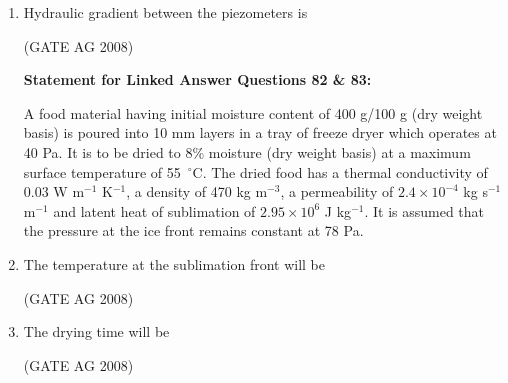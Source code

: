 \documentclass[journal,12pt,onecolumn]{IEEEtran}
\begin{document}
\begin{enumerate}
\medskip

\item 
 Hydraulic gradient between the piezometers is
\begin{enumerate}
\end{enumerate}
\hfill(GATE AG 2008)\\

\medskip

\textbf{Statement for Linked Answer Questions 82 \& 83:}

A food material having initial moisture content of 400 g/100 g (dry weight basis) is poured into 10 mm layers in a tray of freeze dryer which operates at 40 Pa. It is to be dried to 8\% moisture (dry weight basis) at a maximum surface temperature of 55~$^\circ$C. The dried food has a thermal conductivity of 0.03 W m$^{-1}$ K$^{-1}$, a density of 470 kg m$^{-3}$, a permeability of $2.4\times 10^{-4}$ kg s$^{-1}$ m$^{-1}$ and latent heat of sublimation of $2.95 \times 10^6$ J kg$^{-1}$. It is assumed that the pressure at the ice front remains constant at 78 Pa.


\item 
 The temperature at the sublimation front will be
\begin{enumerate}
\end{enumerate}
\hfill(GATE AG 2008)\\

\medskip

\item 
 The drying time will be
\begin{enumerate}
\end{enumerate}
\hfill(GATE AG 2008)\\


\end{enumerate}
\end{document}
